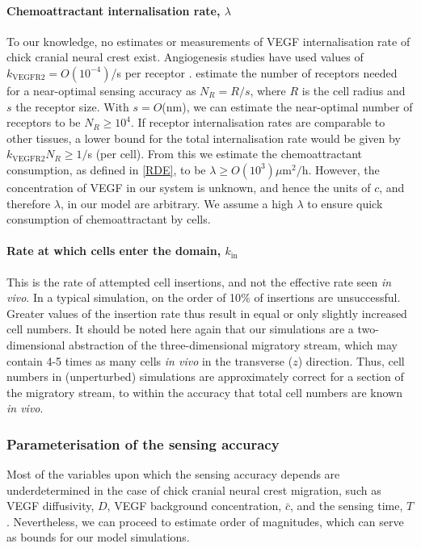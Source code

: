 \documentclass[review]{elsarticle}
\begin{document}
            \paragraph{Chemoattractant internalisation rate, $\lambda$}
            To our knowledge, no estimates or measurements of VEGF internalisation rate of chick cranial neural crest exist. Angiogenesis studies have used values of $k_\mathrm{VEGFR2} = O(10^{-4})$/s per receptor \cite{MacGabhann2005,Yen2011}. \cite{Berg1977} estimate the number of receptors needed for a near-optimal sensing accuracy as $N_R = R/s$, where $R$ is the cell radius and $s$ the receptor size. With $s = O$(nm), we can estimate the near-optimal number of receptors to be $N_R \geq 10^4$. If receptor internalisation rates are comparable to other tissues, a lower bound {for the total internalisation rate would be given by $k_\mathrm{VEGFR2}N_R \ge 1/$s (per cell). From this we estimate the chemoattractant consumption, as defined in \eqref{RDE}, to be $\lambda \ge O(10^3)\mu$m$^2/$h.} However, the concentration of VEGF in our system is unknown, and hence the units of $c$, and therefore $\lambda$, in our model are arbitrary. We assume a high $\lambda$ to ensure quick consumption of chemoattractant by cells.
            
            \paragraph{Rate at which cells enter the domain, $k_\mathrm{in}$}
            This is the rate of attempted cell insertions, and not the effective rate seen \textsl{in vivo}. In a typical simulation, on the order of 10$\%$ of insertions are unsuccessful. Greater values of the insertion rate thus result in equal or only slightly increased cell numbers. It should be noted here again that our simulations are a two-dimensional abstraction of the three-dimensional migratory stream, which may contain 4-5 times as many cells \textsl{in vivo} in the transverse ($z$) direction. Thus, cell numbers in (unperturbed) simulations are approximately correct for a section of the migratory stream, to within the accuracy that total cell numbers are known \textsl{in vivo}.
            
    	 \subsubsection{Parameterisation of the sensing accuracy\label{SensingAccuracyParameterisation}}
        Most of the variables upon which the sensing accuracy depends are underdetermined in the case of chick cranial neural crest migration, such as VEGF diffusivity, $D$, VEGF background concentration, $\bar{c}$, and the sensing time, $T$. Nevertheless, we can proceed to estimate order of magnitudes, which can serve as bounds for our model simulations.
        
\end{document}
